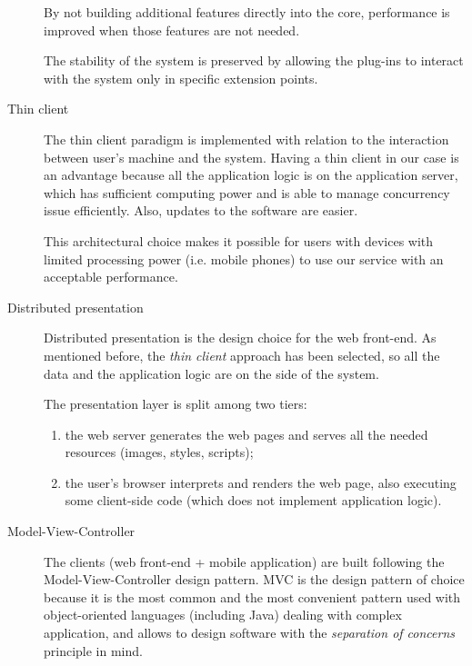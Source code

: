 \begin{description}
By not building additional features directly into the core, performance is improved when those features are not needed.

The stability of the system is preserved by allowing the plug-ins to interact with the system only in specific extension points.

\item[Thin client] The thin client paradigm is implemented with relation to the interaction between user's machine and the system.
Having a thin client in our case is an advantage because all the application logic is on the application server, which has sufficient computing power and is able to manage concurrency issue efficiently. Also, updates to the software are easier.

This architectural choice makes it possible for users with devices with limited processing power (i.e. mobile phones) to use our service with an acceptable performance.

\item[Distributed presentation]
Distributed presentation is the design choice for the web front-end.
As mentioned before, the \emph{thin client} approach has been selected, so all the data and the application logic are on the side of the system.

The presentation layer is split among two tiers:
\begin{enumerate}
    \item the web server generates the web pages and serves all the needed resources (images, styles, scripts);
    \item the user's browser interprets and renders the web page, also executing some client-side code (which does not implement application logic).
\end{enumerate}

\item[Model-View-Controller]
The clients (web front-end + mobile application) are built following the Model-View-Controller design pattern.
MVC is the design pattern of choice because it is the most common and the most convenient pattern used with object-oriented languages (including Java) dealing with complex application, and allows to design software with the \emph{separation of concerns} principle in mind.
\end{description}
